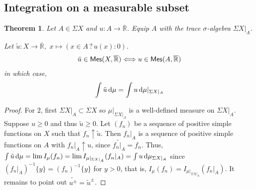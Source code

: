 \documentclass[11pt, a4paper, openany]{book}
\newtheorem{thm}{Theorem}\newtheorem{lem}{Lemma}\newtheorem{crl}{Corollary}
\theoremstyle{definition}
\newcommand{\cat}[1]{\textup{\textsf{#1}}}
\newcommand{\er}{\overline{\mathbb{R}}}
\begin{document}
\subsection{Integration on a measurable subset}
    \begin{thm}
        Let $A\in\Sigma X$ and $u:A\rightarrow \er$. Equip $A$ with the trace $\sigma$-algebra $\Sigma X|_A$.

        Let $\tilde{u}:X\rightarrow \er,\,\,x\mapsto (x\in A\,?\,u(x):0)$.
        \[
            \tilde{u}\in\cat{Mes}(X,\er)\Longleftrightarrow u\in\cat{Mes}(A,\er)
        \]
        in which case,
        \[
            \int \tilde{u}\odif\mu=\int u\odif\mu|_{\Sigma X|_A}
        \]
    \end{thm}
    \begin{proof}
        For $2$, first $\Sigma X|_A\subset \Sigma X$ so $\mu|_{\Sigma X|_A}$ is a well-defined measure on $\Sigma X|_A$. Suppose $u\geqslant 0$ and thus $\tilde{u}\geqslant 0$. Let $(f_n)$ be a sequence of positive simple functions on $X$ such that $f_n\uparrow \tilde{u}$. Then $f_n|_A$ is a sequence of positive simple functions on $A$ with $f_n|_A\uparrow u$, since $\widetilde{f_n|_A}=f_n$. Thus, $\int \tilde{u}\odif\mu=\lim I_\mu(f_n)=\lim I_{\mu|_{\Sigma X|_A}}(f_n|_A)=\int u\odif\mu_{\Sigma X|_A}$ since $(f_n|_A)^{-1}\{y\}=(f_n)^{-1}\{y\}$ for $y>0$, that is, $I_\mu(f_n)=I_{\mu|_{\Sigma X|_A}}(f_n|_A)$. It remains to point out $\widetilde{u^\pm}=\tilde{u}^\pm$.
    \end{proof}
\end{document}
